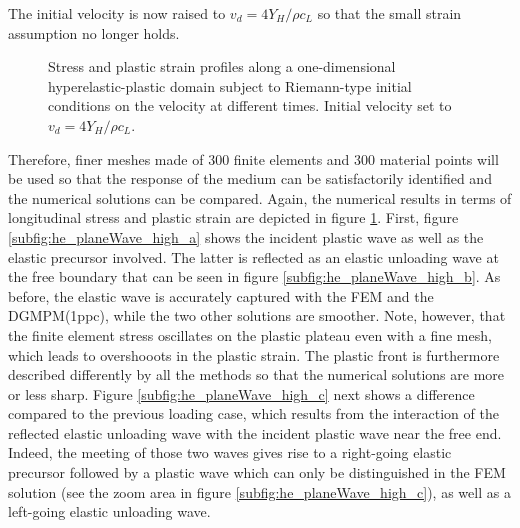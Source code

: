 The initial velocity is now raised to $v_d=4Y_H/\rho c_L$ so that the small strain assumption no longer holds.
\begin{figure}[h!]
  \centering
  {}
  {}
  {}
  {}
  {}
  {}
  {}
  {}
  {}
  
  
  
  \caption{Stress and plastic strain profiles along a one-dimensional hyperelastic-plastic domain subject to Riemann-type initial conditions on the velocity at different times. Initial velocity set to $v_d=4Y_H/\rho c_L$.
  }
  \label{fig:hep_planeWave_high}
\end{figure}
Therefore, finer meshes made of $300$ finite elements and $300$ material points will be used so that the response of the medium can be satisfactorily identified and the numerical solutions can be compared.
Again, the numerical results in terms of longitudinal stress and plastic strain are depicted in figure \ref{fig:hep_planeWave_high}.
First, figure \ref{subfig:he_planeWave_high_a} shows the incident plastic wave as well as the elastic precursor involved.
The latter is reflected as an elastic unloading wave at the free boundary that can be seen in figure \ref{subfig:he_planeWave_high_b}.
As before, the elastic wave is accurately captured with the FEM and the DGMPM(1ppc), while the two other solutions are smoother.
Note, however, that the finite element stress oscillates on the plastic plateau even with a fine mesh, which leads to overshooots in the plastic strain.
The plastic front is furthermore described differently by all the methods so that the numerical solutions are more or less sharp. 
Figure \ref{subfig:he_planeWave_high_c} next shows a difference compared to the previous loading case, which results from the interaction of the reflected elastic unloading wave with the incident plastic wave near the free end.
Indeed, the meeting of those two waves gives rise to a right-going elastic precursor followed by a plastic wave which can only be distinguished in the FEM solution (see the zoom area in figure \ref{subfig:he_planeWave_high_c}), as well as a left-going elastic unloading wave.

